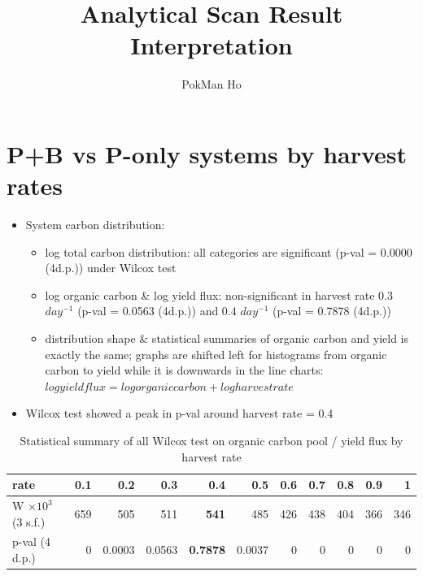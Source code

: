 \documentclass[a4paper]{article}
\title{Analytical Scan Result Interpretation}
\author{PokMan Ho}
\begin{document}
\maketitle

\section{P+B vs P-only systems by harvest rates}
\begin{itemize}
    \item System carbon distribution:
    \begin{itemize}
        \item log total carbon distribution: all categories are significant (p-val = 0.0000 (4d.p.)) under Wilcox test
        \item log organic carbon \& log yield flux: non-significant in harvest rate 0.3 $day^{-1}$ (p-val = 0.0563 (4d.p.)) and 0.4 $day^{-1}$ (p-val = 0.7878 (4d.p.))
        \item distribution shape \& statistical summaries of organic carbon and yield is exactly the same; graphs are shifted left for histograms from organic carbon to yield while it is downwards in the line charts: $log yield flux = log organic carbon + log harvest rate$
    \end{itemize}
    \item Wilcox test showed a peak in p-val around harvest rate = 0.4
\end{itemize}

\begin{table}[H]
    \centering
    \caption{Statistical summary of all Wilcox test on organic carbon pool / yield flux by harvest rate}
    \begin{tabular}{l|rrrrrrrrrr}\hline
        rate & 0.1 & 0.2 & 0.3 & \textbf{0.4} & 0.5 & 0.6 & 0.7 & 0.8 & 0.9 & 1 \\\hline
        W $\times 10^3$ (3 s.f.) & 659 & 505 & 511 & \textbf{541} & 485 & 426 & 438 & 404 & 366 & 346 \\
        p-val (4 d.p.) & 0 & 0.0003 & 0.0563 & \textbf{0.7878} & 0.0037 & 0 & 0 & 0 & 0 & 0 \\\hline
    \end{tabular}
    \label{tab:pVal}
\end{table}
\end{document}
